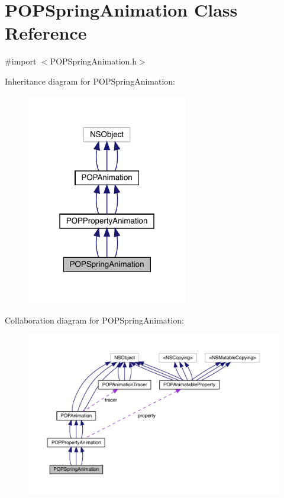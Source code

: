 \hypertarget{interface_p_o_p_spring_animation}{}\section{P\+O\+P\+Spring\+Animation Class Reference}
\label{interface_p_o_p_spring_animation}


{\ttfamily \#import $<$P\+O\+P\+Spring\+Animation.\+h$>$}



Inheritance diagram for P\+O\+P\+Spring\+Animation\+:\nopagebreak
\begin{figure}[H]
\begin{center}
\leavevmode
\includegraphics[width=199pt]{interface_p_o_p_spring_animation__inherit__graph}
\end{center}
\end{figure}


Collaboration diagram for P\+O\+P\+Spring\+Animation\+:\nopagebreak
\begin{figure}[H]
\begin{center}
\leavevmode
\includegraphics[width=350pt]{interface_p_o_p_spring_animation__coll__graph}
\end{center}
\end{figure}
